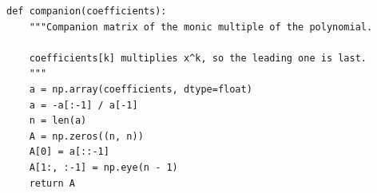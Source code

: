 \begin{verbatim}
def companion(coefficients):
    """Companion matrix of the monic multiple of the polynomial.

    coefficients[k] multiplies x^k, so the leading one is last.
    """
    a = np.array(coefficients, dtype=float)
    a = -a[:-1] / a[-1]
    n = len(a)
    A = np.zeros((n, n))
    A[0] = a[::-1]
    A[1:, :-1] = np.eye(n - 1)
    return A
\end{verbatim}
